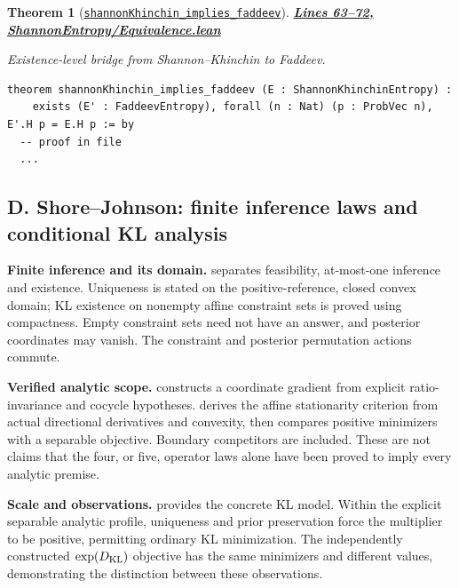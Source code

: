 \documentclass[11pt]{article}
\newtheorem{theorem}{Theorem}[section]
\theoremstyle{definition}
\theoremstyle{remark}
\begin{document}
\begin{theorem}[\href{https://github.com/zariuq/ks-foundations-of-inference/blob/main/InformationTheory/ShannonEntropy/Equivalence.lean\#L63}{\texttt{shannonKhinchin\_implies\_faddeev}}]
\textbf{\href{https://github.com/zariuq/ks-foundations-of-inference/blob/main/InformationTheory/ShannonEntropy/Equivalence.lean\#L63-L72}{Lines 63--72, ShannonEntropy/Equivalence.lean}}

Existence-level bridge from Shannon--Khinchin to Faddeev.
\end{theorem}

\begin{lstlisting}[caption={Shannon--Khinchin -> Faddeev bridge}]
theorem shannonKhinchin_implies_faddeev (E : ShannonKhinchinEntropy) :
    exists (E' : FaddeevEntropy), forall (n : Nat) (p : ProbVec n), E'.H p = E.H p := by
  -- proof in file
  ...
\end{lstlisting}

\subsection*{D. Shore--Johnson: finite inference laws and conditional KL analysis}
\label{app:shore-johnson}

\textbf{Finite inference and its domain.}
 separates feasibility,
at-most-one inference and existence. Uniqueness is stated on the positive-reference,
closed convex domain; KL existence on nonempty affine constraint sets is proved
using compactness. Empty constraint sets need not have an answer, and posterior
coordinates may vanish. The constraint and posterior permutation actions commute.

\textbf{Verified analytic scope.}
 constructs a coordinate
gradient from explicit ratio-invariance and cocycle hypotheses.
 derives the affine stationarity
criterion from actual directional derivatives and convexity, then compares positive
minimizers with a separable objective. Boundary competitors are included.
These are not claims that the four, or five, operator laws alone have been proved
to imply every analytic premise.

\textbf{Scale and observations.}
 provides the concrete KL model.
Within the explicit separable analytic profile, uniqueness and prior preservation
force the multiplier to be positive, permitting ordinary KL minimization.
The independently constructed $\exp(D_{\rm KL})$ objective has the same minimizers
and different values, demonstrating the distinction between these observations.
\end{document}
